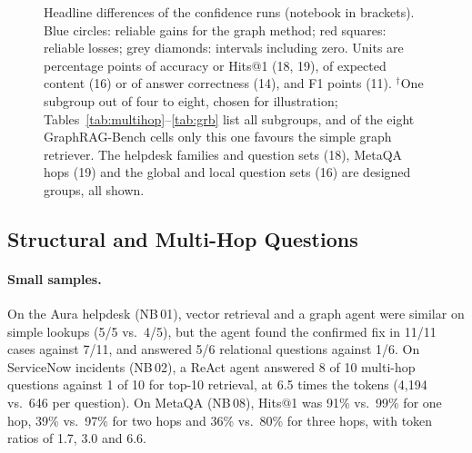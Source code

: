 \documentclass[11pt,a4paper]{article}
\newcommand{\nb}[1]{NB\,#1}
\begin{document}
\begin{figure}[p]
\caption{Headline differences of the confidence runs (notebook in brackets). Blue circles: reliable gains for
the graph method; red squares: reliable losses; grey diamonds: intervals including zero. Units are percentage
points of accuracy or Hits@1 (18, 19), of expected content (16) or of answer correctness (14), and F1 points (11).
$^\dagger$One subgroup out of four to eight, chosen for illustration; Tables~\ref{tab:multihop}--\ref{tab:grb} list
all subgroups, and of the eight GraphRAG-Bench cells only this one favours the simple graph retriever. The helpdesk
families and question sets (18), MetaQA hops (19) and the global and local question sets (16) are designed groups,
all shown.}
\label{fig:forest}
\end{figure}

\subsection{Structural and Multi-Hop Questions}
\label{sec:structure}

\paragraph{Small samples.} On the Aura helpdesk (\nb{01}), vector retrieval and a graph agent were similar on
simple lookups (5/5 vs.\ 4/5), but the agent found the confirmed fix in 11/11 cases against 7/11, and answered
5/6 relational questions against 1/6. On ServiceNow incidents (\nb{02}), a ReAct agent answered 8 of 10 multi-hop
questions against 1 of 10 for top-10 retrieval, at 6.5 times the tokens (4{,}194 vs.\ 646 per question). On
MetaQA (\nb{08}), Hits@1 was 91\% vs.\ 99\% for one hop, 39\% vs.\ 97\% for two hops and 36\% vs.\ 80\% for
three hops, with token ratios of 1.7, 3.0 and 6.6.
\end{document}
